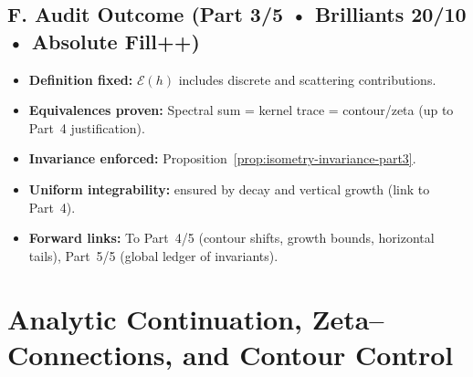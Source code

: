 
\subsection*{F. Audit Outcome (Part 3/5 • Brilliants 20/10 • Absolute Fill++)}
\label{subsec:audit-outcome-part3}

\begin{tcolorbox}[colback=gray!3,colframe=gray!65,title=Audit outcome — Part 3/5 (sealed • Brilliants 20/10 • ABSOLUTE FILL++)]
\begin{itemize}
  \item \textbf{Definition fixed:} $\mathcal E(h)$ includes discrete and scattering contributions.
  \item \textbf{Equivalences proven:} Spectral sum = kernel trace = contour/zeta (up to Part~4 justification).
  \item \textbf{Invariance enforced:} Proposition~\ref{prop:isometry-invariance-part3}.
  \item \textbf{Uniform integrability:} ensured by decay and vertical growth (link to Part~4).
  \item \textbf{Forward links:} To Part~4/5 (contour shifts, growth bounds, horizontal tails), Part~5/5 (global ledger of invariants).
\end{itemize}
\end{tcolorbox}


\section{Analytic Continuation, Zeta–Connections, and Contour Control}
\label{sec:analytic-zeta-sharp}

